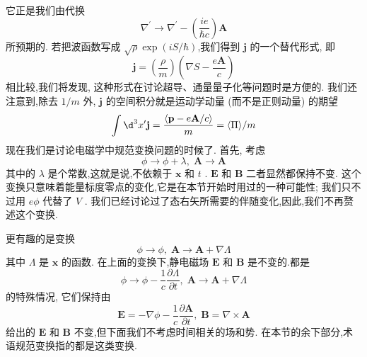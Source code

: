 它正是我们由代换
\begin{equation}
{\nabla }^{\prime } \rightarrow {\nabla }^{\prime } - \left( \frac{ie}{\hbar c}\right) \mathbf{A}
\end{equation}
所预期的. 若把波函数写成 $\sqrt{\rho }\exp \left( {{iS}/\hbar }\right)$,我们得到 $\mathbf{j}$ 的一个替代形式, 即
\begin{equation}
\mathbf{j} = \left( \frac{\rho }{m}\right) \left( {\nabla S - \frac{e\mathbf{A}}{c}}\right)
\end{equation}
相比较,我们将发现, 这种形式在讨论超导、通量量子化等问题时是方便的. 我们还注意到,除去 $1/m$ 外, $\mathbf{j}$ 的空间积分就是运动学动量 (而不是正则动量) 的期望
\begin{equation}
\int {\d}^{3}{x}^{\prime }\mathbf{j} = \frac{\langle \mathbf{p} - e\mathbf{A}/c\rangle }{m} = \langle \Pi \rangle /m
\end{equation}
现在我们是讨论电磁学中规范变换问题的时候了. 首先, 考虑
\begin{equation}
\phi \rightarrow \phi + \lambda ,\;\mathbf{A} \rightarrow \mathbf{A}
\end{equation}
其中的 $\lambda$ 是个常数,这就是说,不依赖于 $\mathbf{x}$ 和 $t$ . $\mathbf{E}$ 和 $\mathbf{B}$ 二者显然都保持不变. 这个变换只意味着能量标度零点的变化,它是在本节开始时用过的一种可能性; 我们只不过用 ${e\phi }$ 代替了 $V$ . 我们已经讨论过了态右矢所需要的伴随变化,因此,我们不再赘述这个变换.

更有趣的是变换
\begin{equation}
\phi \rightarrow \phi ,\;\mathbf{A} \rightarrow \mathbf{A} + \nabla \Lambda
\end{equation}
其中 $\Lambda$ 是 $\mathbf{x}$ 的函数. 在上面的变换下,静电磁场 $\mathbf{E}$ 和 $\mathbf{B}$ 是不变的.都是
\begin{equation}
\phi \rightarrow \phi - \frac{1}{c}\frac{\partial \Lambda }{\partial t},\;\mathbf{A} \rightarrow \mathbf{A} + \nabla \Lambda
\end{equation}
的特殊情况, 它们保持由
\begin{equation}
\mathbf{E} = - \nabla \phi - \frac{1}{c}\frac{\partial \mathbf{A}}{\partial t},\;\mathbf{B} = \nabla \times \mathbf{A}
\end{equation}
给出的 $\mathbf{E}$ 和 $\mathbf{B}$ 不变,但下面我们不考虑时间相关的场和势. 在本节的余下部分,术语规范变换指的都是这类变换.

